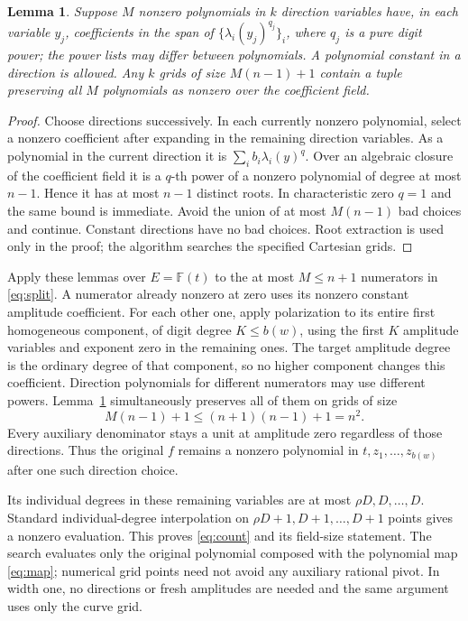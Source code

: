 \documentclass[11pt]{article}
\newtheorem{lemma}[theorem]{Lemma}
\newcommand{\F}{\mathbb F}
\begin{document}
\begin{lemma}\label{lem:directions}
Suppose $M$ nonzero polynomials in $k$ direction variables have, in
each variable $y_j$, coefficients in the span of
$\{\lambda_i(y_j)^{q_j}\}_i$, where $q_j$ is a pure digit power;
the power lists may differ between polynomials. A polynomial constant
in a direction is allowed. Any $k$ grids of size $M(n-1)+1$ contain
a tuple preserving all $M$ polynomials as nonzero over the coefficient
field.
\end{lemma}
\begin{proof}
Choose directions successively. In each currently nonzero polynomial,
select a nonzero coefficient after expanding in the remaining
direction variables. As a polynomial in the current direction it is
$\sum_i b_i\lambda_i(y)^{q}$. Over an algebraic closure of the
coefficient field it is a $q$-th power of a nonzero polynomial of
degree at most $n-1$. Hence it has at most $n-1$ distinct roots.
In characteristic zero $q=1$ and the same bound is immediate.
Avoid the union of at most $M(n-1)$ bad choices and continue.
Constant directions have no bad choices. Root extraction is used only
in the proof; the algorithm searches the specified Cartesian grids.
\end{proof}

Apply these lemmas over $E=\F(t)$ to the at most $M\le n+1$
numerators in \eqref{eq:split}. A numerator already nonzero at zero
uses its nonzero constant amplitude coefficient. For each other one,
apply polarization to its entire first homogeneous component, of digit
degree $K\le b(w)$, using the first $K$ amplitude variables and
exponent zero in the remaining ones. The target amplitude degree is
the ordinary degree of that component, so no higher component changes
this coefficient. Direction polynomials for different numerators may
use different powers. Lemma~\ref{lem:directions} simultaneously
preserves all of them on grids of size
\[
 M(n-1)+1\le(n+1)(n-1)+1=n^2.
\]
Every auxiliary denominator stays a unit at amplitude zero regardless
of those directions. Thus the original $f$ remains a nonzero polynomial
in $t,z_1,\ldots,z_{b(w)}$ after one such direction choice.

Its individual degrees in these remaining variables are at most
$\rho D,D,\ldots,D$. Standard individual-degree interpolation on
$\rho D+1,D+1,\ldots,D+1$ points gives a nonzero evaluation.
This proves \eqref{eq:count} and its field-size statement. The search
evaluates only the original polynomial composed with the polynomial
map \eqref{eq:map}; numerical grid points need not avoid any auxiliary
rational pivot. In width one, no directions or fresh amplitudes are
needed and the same argument uses only the curve grid.
\end{document}
